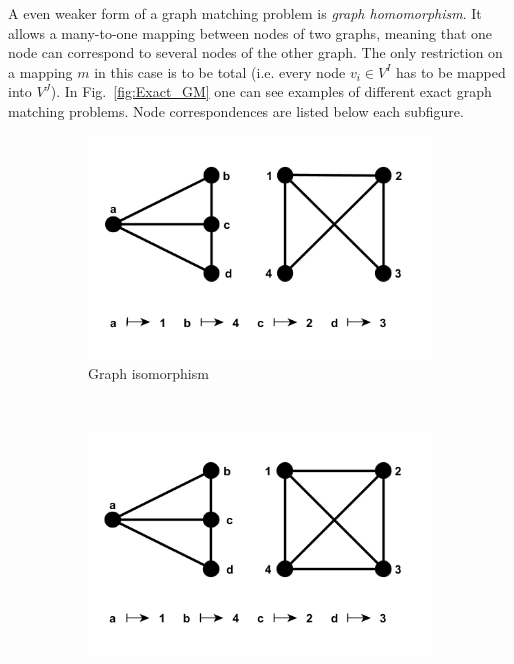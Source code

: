 A even weaker form of a graph matching problem is \emph{graph homomorphism}. It allows a many-to-one mapping between nodes of two graphs, meaning that one node can correspond to several nodes of the other graph. The only restriction on a mapping $m$ in this case is to be total (i.e. every node $v_i\in V^I$ has to be mapped into $V^J$).
In Fig.~\ref{fig:Exact_GM} one can see examples of different exact graph matching problems. Node correspondences are listed below each subfigure.
\begin{figure}[h!]
    \centering
    \begin{subfigure}[b]{0.3\textwidth}
        \includegraphics[width=\textwidth]{chapter1/fig/GI}
        \caption{Graph isomorphism}
        \label{fig:GI}
    \end{subfigure}
    ~
    \begin{subfigure}[b]{0.3\textwidth}
        \includegraphics[width=\textwidth]{chapter1/fig/monomorphism}

\end{subfigure}
\end{figure}
